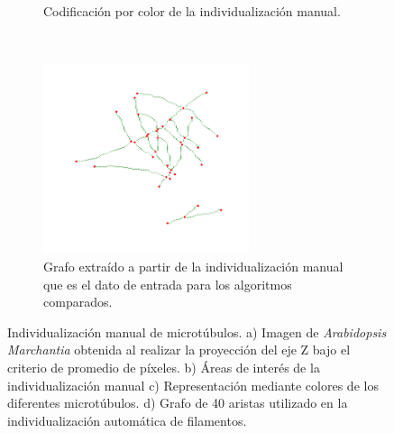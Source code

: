 \begin{figure}[h!]
\begin{subfigure}[t]{0.49\textwidth}
        \caption{Codificaci\'on por color de la individualizaci\'on manual.}
        \label{fig:field3t0filtered1-indivManual}
    \end{subfigure}
    ~
    \begin{subfigure}[t]{0.49\textwidth}
        \centering
        \includegraphics[height=2.2in]{benchImages/field3-t0-2cellBcrop-filtered-graph-thick.png}
        \caption{Grafo extra\'ido a partir de la individualizaci\'on manual que es el dato de entrada para los algoritmos comparados.}
        \label{fig:field3t0filtered1-graph}
    \end{subfigure}
    \caption[Individualizaci\'on manual de microt\'ubulos para la muestra MT-B.]{Individualizaci\'on manual de microt\'ubulos. a) Imagen de {\it Arabidopsis Marchantia} obtenida al realizar la proyecci\'on del eje Z bajo el criterio de promedio de p\'ixeles. b) \'Areas de inter\'es de la individualizaci\'on manual c) Representaci\'on mediante colores de los diferentes microt\'ubulos. d) Grafo de 40 aristas utilizado en la individualizaci\'on autom\'atica de filamentos.}
    \label{fig:field3t0filtered1}
\end{figure}



